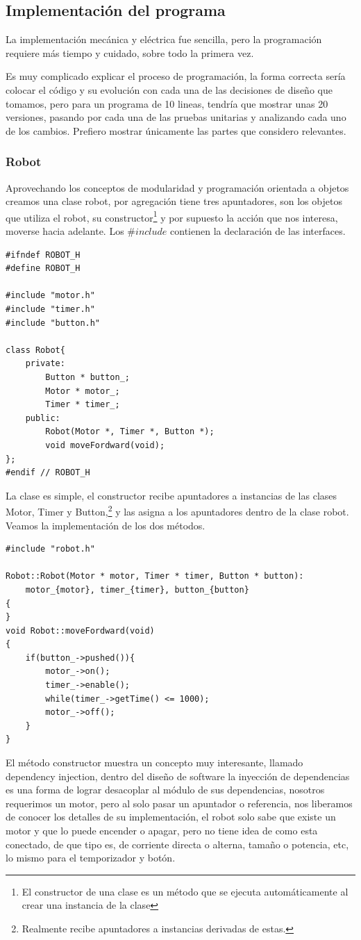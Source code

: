 \subsection{Implementación del programa}
La implementación mecánica y eléctrica fue sencilla, pero la programación requiere
más tiempo y cuidado, sobre todo la primera vez.

Es muy complicado explicar el proceso de programación, la forma correcta sería 
colocar el código y su evolución con cada una de las decisiones de diseño que
tomamos, pero para un programa de 10 lineas, tendría que mostrar unas 20 versiones,
pasando por cada una de las pruebas unitarias y analizando cada uno de los cambios.
Prefiero mostrar únicamente las partes que considero relevantes.

\subsubsection{Robot}
Aprovechando los conceptos de modularidad y programación orientada a objetos
creamos una clase robot, por agregación tiene tres apuntadores, son los objetos 
que utiliza el robot, su constructor\footnote{El constructor de una clase es un
método que se ejecuta automáticamente al crear una instancia de la clase} y por
supuesto la acción que nos interesa, moverse hacia adelante. Los $\#include$
contienen la declaración de las interfaces.
\begin{verbatim}
#ifndef ROBOT_H
#define ROBOT_H

#include "motor.h"
#include "timer.h"
#include "button.h"

class Robot{
	private:
		Button * button_;
		Motor * motor_;
		Timer * timer_;
	public:
		Robot(Motor *, Timer *, Button *);
		void moveFordward(void);
};
#endif // ROBOT_H
\end{verbatim}
La clase es simple, el constructor recibe apuntadores a instancias de las clases
Motor, Timer y Button,\footnote{Realmente recibe apuntadores a instancias 
derivadas de estas.} y las asigna a los apuntadores dentro de la clase robot.
Veamos la implementación de los dos métodos.
\begin{verbatim}
#include "robot.h"

Robot::Robot(Motor * motor, Timer * timer, Button * button):
	motor_{motor}, timer_{timer}, button_{button}
{
}
void Robot::moveFordward(void)
{
	if(button_->pushed()){
		motor_->on();
		timer_->enable();
		while(timer_->getTime() <= 1000);
		motor_->off();
	}
}
\end{verbatim}
El método constructor muestra un concepto muy interesante, llamado dependency 
injection, 
dentro del diseño de software la inyección de dependencias es una forma de lograr
desacoplar al módulo de sus dependencias, nosotros requerimos un motor, pero al
solo pasar un apuntador o referencia, nos liberamos de conocer los detalles de 
su implementación, el robot solo sabe que existe un motor y que lo puede encender o
apagar, pero no tiene idea de como esta conectado, de que tipo es, de corriente directa o
alterna, tamaño o potencia, etc, lo mismo para el temporizador y botón.

